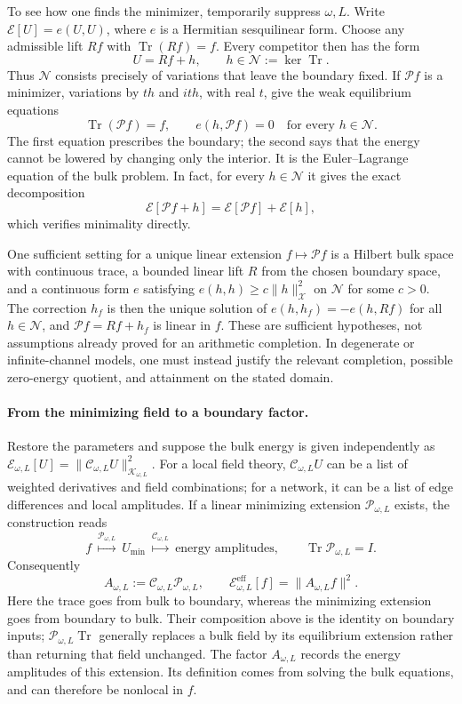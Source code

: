 To see how one finds the minimizer, temporarily suppress $\omega,L$.
Write $\mathcal E[U]=e(U,U)$, where $e$ is a Hermitian
sesquilinear form. Choose any admissible lift $Rf$ with
$\operatorname{Tr}(Rf)=f$. Every competitor then has the form
\[
U=Rf+h,\qquad h\in\mathcal N:=\ker\operatorname{Tr}.
\]
Thus $\mathcal N$ consists precisely of variations that leave the
boundary fixed. If $\mathcal P f$ is a minimizer, variations by
$t h$ and $it h$, with real $t$, give the weak equilibrium equations
\[
\operatorname{Tr}(\mathcal P f)=f,\qquad
e(h,\mathcal P f)=0\quad\text{for every }h\in\mathcal N.
\]
The first equation prescribes the boundary; the second says that
the energy cannot be lowered by changing only the interior.
It is the Euler--Lagrange equation of the bulk problem. In fact,
for every $h\in\mathcal N$ it gives the exact decomposition
\[
\mathcal E[\mathcal P f+h]
=\mathcal E[\mathcal P f]+\mathcal E[h],
\]
which verifies minimality directly.

One sufficient setting for a unique linear extension
$f\mapsto\mathcal P f$ is a Hilbert bulk space with continuous trace,
a bounded linear lift $R$ from the chosen boundary space, and a
continuous form $e$ satisfying
$e(h,h)\geq c\lVert h\rVert_{\mathcal X}^2$ on $\mathcal N$ for
some $c>0$. The correction $h_f$ is then the unique solution of
$e(h,h_f)=-e(h,Rf)$ for all $h\in\mathcal N$, and
$\mathcal P f=Rf+h_f$ is linear in $f$. These are sufficient
hypotheses, not assumptions already proved for an arithmetic
completion. In degenerate or infinite-channel models, one must
instead justify the relevant completion, possible zero-energy
quotient, and attainment on the stated domain.

\paragraph{From the minimizing field to a boundary factor.}
Restore the parameters and suppose the bulk energy is given
independently as
$\mathcal E_{\omega,L}[U]
=\lVert\mathcal C_{\omega,L}U\rVert_{\mathcal K_{\omega,L}}^2$.
For a local field theory, $\mathcal C_{\omega,L}U$ can be a list
of weighted derivatives and field combinations; for a network,
it can be a list of edge differences and local amplitudes.
If a linear minimizing extension $\mathcal P_{\omega,L}$ exists,
the construction reads
\[
f\ \overset{\mathcal P_{\omega,L}}{\longmapsto}\ U_{\min}
\ \overset{\mathcal C_{\omega,L}}{\longmapsto}\ \text{energy amplitudes},
\qquad
\operatorname{Tr}\mathcal P_{\omega,L}=I.
\]
Consequently
\[
A_{\omega,L}:=\mathcal C_{\omega,L}\mathcal P_{\omega,L},
\qquad
\mathcal E_{\omega,L}^{\mathrm{eff}}[f]
=\lVert A_{\omega,L}f\rVert^2.
\]
Here the trace goes from bulk to boundary, whereas the minimizing
extension goes from boundary to bulk. Their composition above is
the identity on boundary inputs; $\mathcal P_{\omega,L}
\operatorname{Tr}$ generally replaces a bulk field by its
equilibrium extension rather than returning that field unchanged.
The factor $A_{\omega,L}$ records the energy amplitudes of this
extension. Its definition comes from solving the bulk equations,
and can therefore be nonlocal in $f$.

